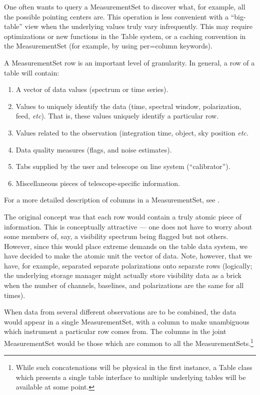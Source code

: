 One often wants to query a MeasurementSet to discover what, for
example, all the possible pointing centers are. This operation is less
convenient with a ``big-table'' view when the underlying values truly
vary infrequently. This may require optimizations or new functions in
the Table system, or a caching convention in the MeasurementSet (for
example, by using per=column keywords).

A MeasurementSet row is an important level of granularity.  In
general, a row of a table will contain:
\begin{enumerate}
\item A vector of data values (spectrum or time series).
\item Values to uniquely identify the data (time, spectral window,
polarization, feed, {\em etc}). That is, these values uniquely identify
a particular row.
\item Values related to the observation (integration time, object, sky
position {\em etc.}
\item Data quality measures (flags, and noise estimates).
\item Tabs supplied by the user and telescope on line system
(``calibrator'').
\item Miscellaneous pieces of telescope-specific information.
\end{enumerate}
For a more detailed description of columns in a MeasurementSet, see
\cite{garwood:sdci}.

The original concept was that each row would contain a truly atomic
piece of information. This is conceptually attractive --- one does not
have to worry about some members of, say, a visibility spectrum being
flagged but not others. However, since this would place extreme
demands on the table data system, we have decided to make the atomic
unit the vector of data. Note, however, that we have, for example,
separated separate polarizations onto separate rows (logically; the
underlying storage manager might actually store visibility data as a
brick when the number of channels, baselines, and polarizations are
the same for all times).

When data from several different observations are to be combined, the
data would appear in a single MeasurementSet, with a column to make
unambiguous which instrument a particular row comes from. The columns
in the joint MeasurementSet would be those which are common to all the
MeasurementSets.\footnote{While such concatenations will be physical
in the first instance, a Table class which presents a single table
interface to multiple underlying tables will be available at some
point.}


